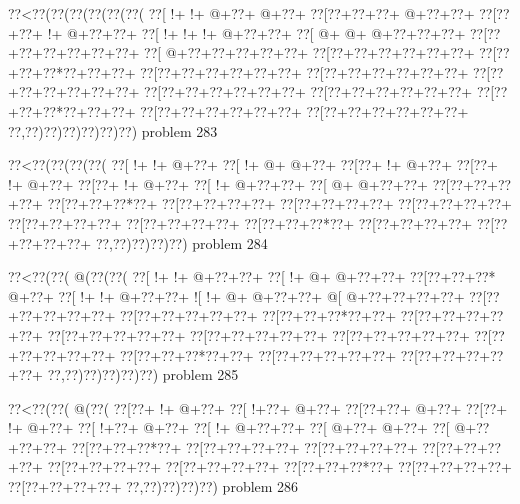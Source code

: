 \vbox{\vbox{\goo
\0??<\0??(\0??(\0??(\0??(\0??(\0??(
\0??[\- !+\- !+\- @+\0??+\- @+\0??+
\0??[\0??+\0??+\0??+\- @+\0??+\0??+
\0??[\0??+\0??+\- !+\- @+\0??+\0??+
\0??[\- !+\- !+\- !+\- @+\0??+\0??+
\0??[\- @+\- @+\- @+\0??+\0??+\0??+
\0??[\0??+\0??+\0??+\0??+\0??+\0??+
\0??[\- @+\0??+\0??+\0??+\0??+\0??+
\0??[\0??+\0??+\0??+\0??+\0??+\0??+
\0??[\0??+\0??+\0??*\0??+\0??+\0??+
\0??[\0??+\0??+\0??+\0??+\0??+\0??+
\0??[\0??+\0??+\0??+\0??+\0??+\0??+
\0??[\0??+\0??+\0??+\0??+\0??+\0??+
\0??[\0??+\0??+\0??+\0??+\0??+\0??+
\0??[\0??+\0??+\0??+\0??+\0??+\0??+
\0??[\0??+\0??+\0??*\0??+\0??+\0??+
\0??[\0??+\0??+\0??+\0??+\0??+\0??+
\0??[\0??+\0??+\0??+\0??+\0??+\0??+
\0??,\0??)\0??)\0??)\0??)\0??)\0??)
}
\hfil problem 283\hfil\break
}

\vbox{\vbox{\goo
\0??<\0??(\0??(\0??(\0??(
\0??[\- !+\- !+\- @+\0??+
\0??[\- !+\- @+\- @+\0??+
\0??[\0??+\- !+\- @+\0??+
\0??[\0??+\- !+\- @+\0??+
\0??[\0??+\- !+\- @+\0??+
\0??[\- !+\- @+\0??+\0??+
\0??[\- @+\- @+\0??+\0??+
\0??[\0??+\0??+\0??+\0??+
\0??[\0??+\0??+\0??*\0??+
\0??[\0??+\0??+\0??+\0??+
\0??[\0??+\0??+\0??+\0??+
\0??[\0??+\0??+\0??+\0??+
\0??[\0??+\0??+\0??+\0??+
\0??[\0??+\0??+\0??+\0??+
\0??[\0??+\0??+\0??*\0??+
\0??[\0??+\0??+\0??+\0??+
\0??[\0??+\0??+\0??+\0??+
\0??,\0??)\0??)\0??)\0??)
}
\hfil problem 284\hfil\break
}

\vbox{\vbox{\goo
\0??<\0??(\0??(\- @(\0??(\0??(
\0??[\- !+\- !+\- @+\0??+\0??+
\0??[\- !+\- @+\- @+\0??+\0??+
\0??[\0??+\0??+\0??*\- @+\0??+
\0??[\- !+\- !+\- @+\0??+\0??+
\- ![\- !+\- @+\- @+\0??+\0??+
\- @[\- @+\0??+\0??+\0??+\0??+
\0??[\0??+\0??+\0??+\0??+\0??+
\0??[\0??+\0??+\0??+\0??+\0??+
\0??[\0??+\0??+\0??*\0??+\0??+
\0??[\0??+\0??+\0??+\0??+\0??+
\0??[\0??+\0??+\0??+\0??+\0??+
\0??[\0??+\0??+\0??+\0??+\0??+
\0??[\0??+\0??+\0??+\0??+\0??+
\0??[\0??+\0??+\0??+\0??+\0??+
\0??[\0??+\0??+\0??*\0??+\0??+
\0??[\0??+\0??+\0??+\0??+\0??+
\0??[\0??+\0??+\0??+\0??+\0??+
\0??,\0??)\0??)\0??)\0??)\0??)
}
\hfil problem 285\hfil\break
}

\vbox{\vbox{\goo
\0??<\0??(\0??(\- @(\0??(
\0??[\0??+\- !+\- @+\0??+
\0??[\- !+\0??+\- @+\0??+
\0??[\0??+\0??+\- @+\0??+
\0??[\0??+\- !+\- @+\0??+
\0??[\- !+\0??+\- @+\0??+
\0??[\- !+\- @+\0??+\0??+
\0??[\- @+\0??+\- @+\0??+
\0??[\- @+\0??+\0??+\0??+
\0??[\0??+\0??+\0??*\0??+
\0??[\0??+\0??+\0??+\0??+
\0??[\0??+\0??+\0??+\0??+
\0??[\0??+\0??+\0??+\0??+
\0??[\0??+\0??+\0??+\0??+
\0??[\0??+\0??+\0??+\0??+
\0??[\0??+\0??+\0??*\0??+
\0??[\0??+\0??+\0??+\0??+
\0??[\0??+\0??+\0??+\0??+
\0??,\0??)\0??)\0??)\0??)
}
\hfil problem 286\hfil\break
}

